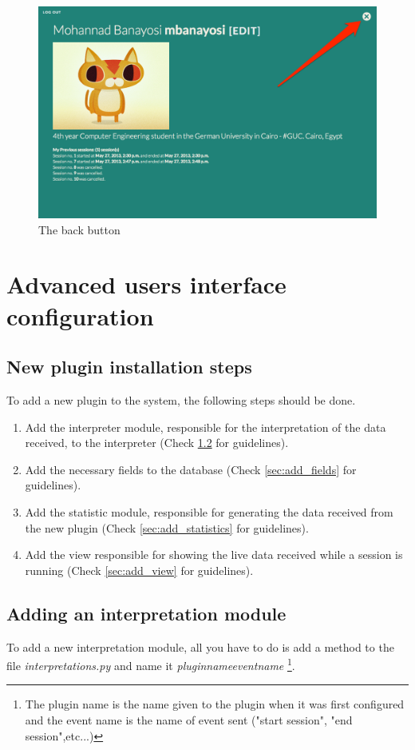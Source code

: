 \begin{figure}[htbp]
\centering 
\includegraphics[width=1.0\linewidth]{steps/BackButton} 
\caption{The back button} 
\label{fig:back} 
\end{figure} 

\newpage

\section{Advanced users interface configuration}

\subsection{New plugin installation steps}\label{sec:installation}
To add a new plugin to the system, the following steps should be done.

\begin{enumerate}
\item Add the interpreter module, responsible for the interpretation of the data received, to the interpreter (Check \ref{sec:add_interpreter} for guidelines).
\item Add the necessary fields to the database (Check \ref{sec:add_fields} for guidelines).
\item Add the statistic module, responsible for generating the data received from the new plugin (Check \ref{sec:add_statistics} for guidelines).
\item Add the view responsible for showing the live data received while a session is running (Check \ref{sec:add_view} for guidelines).
\end{enumerate}

\subsection{Adding an interpretation module}\label{sec:add_interpreter}
To add a new interpretation module, all you have to do is add a method to the file \emph{interpretations.py} and name it \emph{pluginname}\textunderscore \emph{eventname} \footnote{The plugin name is the name given to the plugin when it was first configured and the event name is the name of event sent ("start session", "end session",etc...)}.

